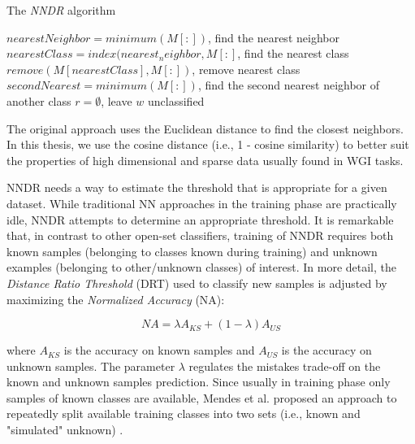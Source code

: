 \begin{algorithm}[t]
\caption{The \textit{NNDR} algorithm}
\label{alg:NNDR_algorithm}

$nearestNeighbor = minimum(M[:])$, find the nearest neighbor\;
$nearestClass = index(nearest_neighbor, M[:]$, find the nearest class\;
$remove(M[nearestClass],M[:])$, remove nearest class\;
$secondNearest = minimum(M[:])$, find the second nearest neighbor of another class\;
    {$r = \emptyset$, leave $w$ unclassified\;}

\end{algorithm}

The original approach uses the Euclidean distance to find the closest neighbors. In this thesis, we use the cosine distance (i.e., 1 - cosine similarity) to better suit the properties of high dimensional and sparse data usually found in WGI tasks. 

NNDR needs a way to estimate the threshold that is appropriate for a given dataset. While traditional NN approaches in the training phase are practically idle, NNDR attempts to determine an appropriate threshold. It is remarkable that, in contrast to other open-set classifiers, training of NNDR requires both known samples (belonging to classes known during training) and unknown examples (belonging to other/unknown classes) of interest. In more detail, the \textit{Distance Ratio Threshold} (DRT) used to classify new samples is adjusted by maximizing the \textit{Normalized Accuracy} (NA):

\begin{equation}
\label{eq:normalized_accuracy}
NA = \lambda A_{KS} + (1 - \lambda) A_{US}
\end{equation}

\nointend where $A_{KS}$ is the accuracy on known samples and $A_{US}$ is the accuracy on unknown samples. The parameter $\lambda$ regulates the mistakes trade-off on the known and unknown samples prediction. Since usually in training phase only samples of known classes are available, Mendes et al. proposed an approach to repeatedly split available training classes into two sets (i.e., known and "simulated" unknown) . 

